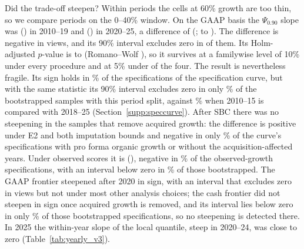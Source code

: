Did the trade-off steepen? Within periods the cells at 60\% growth are too thin, so we compare periods on the 0--40\% window. On the GAAP basis the $\Psi_{0.90}$ slope was \PsiEarlyOp{} (\PsiEarlyOpSe) in 2010--19 and \PsiLateOp{} (\PsiLateOpSe) in 2020--25, a difference of \PsiDiffOpEone{} (\PsiDiffOpEoneSe; \PsiDiffOpEoneLo{} to \PsiDiffOpEoneHi). The difference is negative in \PsiDiffOpSignNeg{} views, and its 90\% interval excludes zero in \PsiDiffOpCountNeg{} of them. Its Holm-adjusted $p$-value is \HolmPsiDiffLo{} to \HolmPsiDiffHi{} (Romano--Wolf \HolmPsiDiffRW), so it survives at a familywise level of 10\% under every procedure and at 5\% under \HolmDiffFive{} of the four. The result is nevertheless fragile. Its sign holds in \ScDiffOpShare\% of the specifications of the specification curve, but with the same statistic its 90\% interval excludes zero in only \ScDiffOpBootNinetySplitAShare\% of the bootstrapped samples with this period split, against \ScDiffOpBootNinetySplitBShare\% when 2010--15 is compared with 2018--25 (Section~\ref{supp:speccurve}). After SBC there was no steepening in the samples that remove acquired growth: the difference is positive under E2 and both imputation bounds and negative in only \ScDiffCashNegOrg\% of the curve's specifications with pro forma organic growth or without the acquisition-affected years. Under observed scores it is \PsiDiffCashEone{} (\PsiDiffCashEoneSe), negative in \ScDiffCashNegObs\% of the observed-growth specifications, with an interval below zero in \ScDiffCashBootNegObs\% of those bootstrapped. The GAAP frontier steepened after 2020 in sign, with an interval that excludes zero in \PsiDiffOpCountNeg{} views but not under most other analysis choices; the cash frontier did not steepen in sign once acquired growth is removed, and its interval lies below zero in only \ScDiffCashBootNegOther\% of those bootstrapped specifications, so no steepening is detected there. In 2025 the within-year slope of the local quantile, steep in 2020--24, was close to zero (Table~\ref{tab:yearly_v3}).

